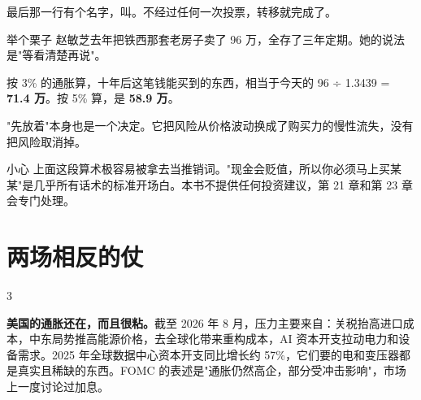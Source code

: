 最后那一行有个名字，叫。不经过任何一次投票，转移就完成了。

\begin{egbox}{举个栗子}
赵敏芝去年把铁西那套老房子卖了 96 万，全存了三年定期。她的说法是"等看清楚再说"。

按 3\% 的通胀算，十年后这笔钱能买到的东西，相当于今天的 96 ÷ 1.3439 = \textbf{71.4 万}。按 5\% 算，是 \textbf{58.9 万}。

"先放着"本身也是一个决定。它把风险从价格波动换成了购买力的慢性流失，没有把风险取消掉。

\end{egbox}

\begin{warnbox}{小心}
上面这段算术极容易被拿去当推销词。"现金会贬值，所以你必须马上买某某"是几乎所有话术的标准开场白。本书不提供任何投资建议，第 21 章和第 23 章会专门处理。

\end{warnbox}

\section{两场相反的仗}

\begin{statrow}{3}
\end{statrow}

\textbf{美国的通胀还在，而且很粘。}截至 2026 年 8 月，压力主要来自：关税抬高进口成本，中东局势推高能源价格，去全球化带来重构成本，AI 资本开支拉动电力和设备需求。2025 年全球数据中心资本开支同比增长约 57\%，它们要的电和变压器都是真实且稀缺的东西。FOMC 的表述是"通胀仍然高企，部分受冲击影响"，市场上一度讨论过加息。

\begin{talkbox}
\end{talkbox}

